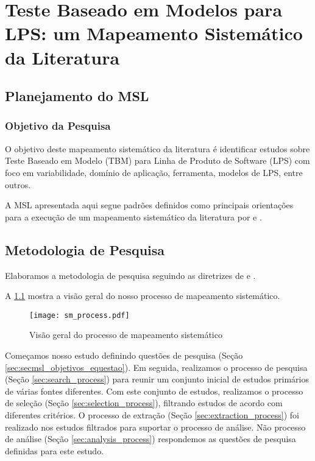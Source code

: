 \chapter{Teste Baseado em Modelos para LPS: um Mapeamento Sistemático da Literatura}
\label{sec:secmsl_MSL}
\pagestyle{plain}

\section{Planejamento do MSL}
\label{sec:secmsl_planejamentosml}
\subsection{Objetivo da Pesquisa}
O objetivo deste mapeamento sistemático da literatura é identificar estudos sobre Teste Baseado em Modelo (TBM) para Linha de Produto de Software (LPS) com foco em variabilidade, domínio de aplicação, ferramenta, modelos de LPS, entre outros.

A MSL apresentada aqui segue padrões definidos como principais orientações para a execução de um mapeamento sistemático da literatura por \citet{kitchenham2004procedures} e \citet{keele2007guidelines}.

\section{Metodologia de Pesquisa}
\label{sec:sec_mslmetodologia}

Elaboramos a metodologia de pesquisa seguindo as diretrizes de \citet{petersen2015guidelines} e \citet{kitchenham2015evidence}.

A \ref{fig:mapping_process} mostra a visão geral do nosso processo de mapeamento sistemático.

\begin{figure} [!h]
	\centering
	\texttt{[image: sm\_process.pdf]}
	\caption{Visão geral do processo de mapeamento sistemático}
	\label{fig:mapping_process}
\end{figure}

Começamos nosso estudo definindo questões de pesquisa (Seção \ref{sec:secmsl_objetivos_equestao}). Em seguida, realizamos o processo de pesquisa (Seção \ref{sec:search_process}) para reunir um conjunto inicial de estudos primários de várias fontes diferentes. Com este conjunto de estudos, realizamos o processo de seleção (Seção \ref{sec:selection_process}), filtrando estudos de acordo com diferentes critérios. O processo de extração (Seção \ref{sec:extraction_process}) foi realizado nos estudos filtrados para suportar o processo de análise. Não processo de análise (Seção \ref{sec:analysis_process}) respondemos as questões de pesquisa definidas para este estudo.


